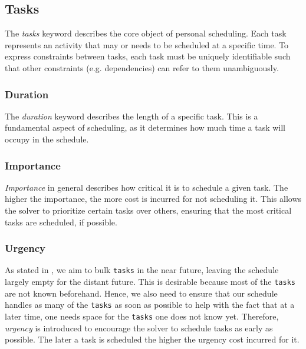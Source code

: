 \subsection*{Tasks}
The \emph{tasks} keyword describes the core object of personal scheduling. Each task represents an activity that may or needs to be scheduled at a specific time. To express constraints between tasks, each task must be uniquely identifiable such that other constraints (e.g. dependencies) can refer to them unambiguously.

\subsubsection*{Duration}
The \emph{duration} keyword describes the length of a specific task. This is a fundamental aspect of scheduling, as it determines how much time a task will occupy in the schedule.

\subsubsection*{Importance}
\label{subsubsec:methodology-language-design:importance}
\emph{Importance} in general describes how critical it is to schedule a given task. The higher the importance, the more cost is incurred for not scheduling it. This allows the solver to prioritize certain tasks over others, ensuring that the most critical tasks are scheduled, if possible.

\subsubsection*{Urgency}
\label{subsubsec:methodology-language-design:urgency}
As stated in , we aim to bulk \texttt{tasks} in the near future, leaving the schedule largely empty for the distant future. This is desirable because most of the \texttt{tasks} are not known beforehand. Hence, we also need to ensure that our schedule handles as many of the \texttt{tasks} as soon as possible to help with the fact that at a later time, one needs space for the \texttt{tasks} one does not know yet. Therefore, \emph{urgency} is introduced to encourage the solver to schedule tasks as early as possible. The later a task is scheduled the higher the urgency cost incurred for it.

